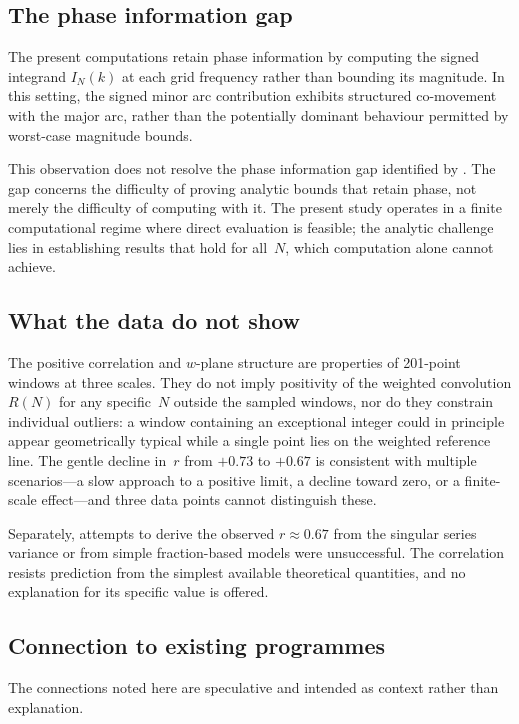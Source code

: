 \documentclass[11pt,a4paper]{article}
\newcommand{\RN}{R(N)}
\newcommand{\IN}{I_N(k)}
\begin{document}
\subsection{The phase information gap}

The present computations retain phase information by computing the signed integrand $\IN$ at each grid frequency rather than bounding its magnitude. In this setting, the signed minor arc contribution exhibits structured co-movement with the major arc, rather than the potentially dominant behaviour permitted by worst-case magnitude bounds.

This observation does not resolve the phase information gap identified by \citet{Tao2012}. The gap concerns the difficulty of proving analytic bounds that retain phase, not merely the difficulty of computing with it. The present study operates in a finite computational regime where direct evaluation is feasible; the analytic challenge lies in establishing results that hold for all~$N$, which computation alone cannot achieve.


\subsection{What the data do not show}

The positive correlation and $w$-plane structure are properties of 201-point windows at three scales. They do not imply positivity of the weighted convolution $\RN$ for any specific~$N$ outside the sampled windows, nor do they constrain individual outliers: a window containing an exceptional integer could in principle appear geometrically typical while a single point lies on the weighted reference line. The gentle decline in~$r$ from $+0.73$ to $+0.67$ is consistent with multiple scenarios---a slow approach to a positive limit, a decline toward zero, or a finite-scale effect---and three data points cannot distinguish these.

Separately, attempts to derive the observed $r \approx 0.67$ from the singular series variance or from simple fraction-based models were unsuccessful. The correlation resists prediction from the simplest available theoretical quantities, and no explanation for its specific value is offered.


\subsection{Connection to existing programmes}

The connections noted here are speculative and intended as context rather than explanation.
\end{document}
